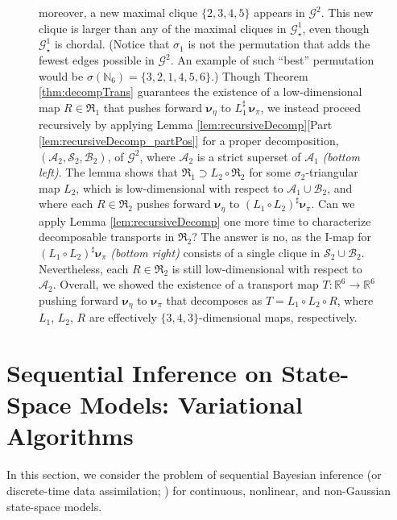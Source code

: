 \documentclass[twoside,11pt]{article}
\newcommand{\genm}{\boldsymbol{\nu} }   %
\newcommand{\re}{\mathbb{R}}
\newcommand{\ra}{\rightarrow}
\newcommand{\Bc}{\mathcal{B}}
\newcommand{\Ac}{\mathcal{A}}
\newcommand{\Sc}{\mathcal{S}}
\newcommand{\Gcb}{\boldsymbol{\mathcal{G}}}
\newcommand{\lmap}{L} %
\newcommand{\rmap}{R} %
\newcommand{\Aset}{ \Ac }
\newcommand{\Bset}{ \Bc }
\newcommand{\Sset}{ \Sc }
\newcommand{\pull}{^\sharp}
\begin{document}
\begin{figure}[]
{        moreover, a new maximal clique $\{2,3,4,5\}$ appears in
        $\Gcb^2$.
        This new clique is larger than any of the maximal cliques in $\Gcb^{1}_\star$,
        even though
        $\Gcb^{1}_\star$ is chordal.
        (Notice that $\sigma_1$ is not the permutation that adds the fewest edges 
        possible in
        $\Gcb^2$. An example of such ``best'' permutation would be
        $\sigma(\mathbb{N}_6)= \{3,2,1,4,5,6\}$.)
        Though Theorem
        \ref{thm:decompTrans} guarantees the existence of a
        low-dimensional map $R \in \mathfrak{R}_1$ that pushes forward 
        $\genm_\eta$ to
        $\lmap_1\pull \, \genm_\pi$, we instead proceed recursively by
        applying Lemma  \ref{lem:recursiveDecomp}[Part \ref{lem:recursiveDecomp_partPos}] 
        for a proper
        decomposition, $(\Aset_2,\Sset_2,\Bset_2)$, of $\Gcb^2$, where 
        $\Aset_2$ is a strict superset of $\Aset_1$ \emph{(bottom left)}.
        The lemma shows that 
        $\mathfrak{R}_1 \supset \lmap_2 \circ \mathfrak{R}_2$
        for some $\sigma_2$-triangular map $\lmap_2$,
        which  
        is low-dimensional with respect to $\Aset_1 \cup \Bset_2$, and
        where each $\rmap \in \mathfrak{R}_2$ pushes forward $\genm_\eta$   to
        $(\lmap_1 \circ \lmap_2)\pull \genm_\pi$. 
        Can we apply Lemma  \ref{lem:recursiveDecomp} one more
        time to characterize decomposable transports in $\mathfrak{R}_2$?
        The answer is no, as the I-map for 
        $(\lmap_1 \circ \lmap_2)\pull \genm_\pi$ 
        \emph{(bottom right)} 
        consists of a
        single clique in $\Sset_2 \cup \Bset_2$. 
        Nevertheless, each $\rmap \in \mathfrak{R}_2$ is still low-dimensional
        with respect to $\Aset_2$. 
        Overall, we showed the existence of a transport
        map $T:\re^6 \ra \re^6$ pushing forward $\genm_\eta$ to $\genm_\pi$ that decomposes as
        $T=\lmap_1 \circ \lmap_2 \circ R$, where $\lmap_1$, $\lmap_2$, 
        $\rmap$ are effectively $\{3,4,3\}$-dimensional maps, respectively.


        }          
\label{fig:graphSparsification}
\end{figure}

\section{Sequential Inference on State-Space Models: Variational Algorithms}
\label{sec:dataAss}
%
%
%
%
In this section, we consider the problem of sequential Bayesian inference 
(or discrete-time data assimilation; 
\citealp{reich2015probabilistic})
%
for continuous, nonlinear, and non-Gaussian 
state-space models.
%
%
%
%
%
%
%
%
%
%
%
%
\end{document}
